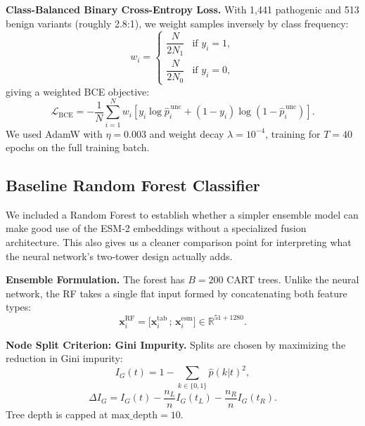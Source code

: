 \documentclass[conference]{IEEEtran}
\newcommand{\xtab}{\mathbf{x}^{\mathrm{tab}}}
\newcommand{\xesm}{\mathbf{x}^{\mathrm{esm}}}
\begin{document}
\vspace{2mm}\noindent\textbf{Class-Balanced Binary Cross-Entropy Loss.}
With 1,441 pathogenic and 513 benign variants (roughly 2.8:1), we weight samples inversely by class frequency:
\begin{equation}
  w_i = \begin{cases}
    \dfrac{N}{2N_1} & \text{if } y_i = 1,\\[6pt]
    \dfrac{N}{2N_0} & \text{if } y_i = 0,
  \end{cases}
  \label{eq:weights}
\end{equation}
giving a weighted BCE objective:
\begin{equation}
  \mathcal{L}_\mathrm{BCE} = -\frac{1}{N}\sum_{i=1}^{N}
    w_i\!\left[y_i \log \hat{p}_i^{\,\mathrm{unc}} +
    (1-y_i)\log(1-\hat{p}_i^{\,\mathrm{unc}})\right].
  \label{eq:bce}
\end{equation}
We used AdamW \cite{loshchilov2019adamw} with $\eta=0.003$ and weight decay $\lambda=10^{-4}$, training for $T=40$ epochs on the full training batch.

\subsection{Baseline Random Forest Classifier}

We included a Random Forest \cite{breiman2001rf} to establish whether a simpler ensemble model can make good use of the ESM-2 embeddings without a specialized fusion architecture. This also gives us a cleaner comparison point for interpreting what the neural network's two-tower design actually adds.

\vspace{2mm}\noindent\textbf{Ensemble Formulation.}
The forest has $B=200$ CART trees. Unlike the neural network, the RF takes a single flat input formed by concatenating both feature types:
\begin{equation}
  \mathbf{x}_i^{\mathrm{RF}} = \bigl[\xtab_i\,;\,\xesm_i\bigr]
    \in \mathbb{R}^{51+1280}.
  \label{eq:rf_input}
\end{equation}

\vspace{2mm}\noindent\textbf{Node Split Criterion: Gini Impurity.}
Splits are chosen by maximizing the reduction in Gini impurity:
\begin{equation}
  I_G(t) = 1 - \sum_{k\in\{0,1\}} \hat{p}(k|t)^2,
  \label{eq:gini}
\end{equation}
\begin{equation}
  \Delta I_G = I_G(t) - \frac{n_L}{n}I_G(t_L) - \frac{n_R}{n}I_G(t_R).
\end{equation}
Tree depth is capped at $\mathrm{max\_depth}=10$.
\end{document}

